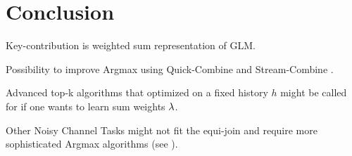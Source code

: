 \chapter{Conclusion}
\label{ch:conclusion}

\begin{draft}
Key-contribution is weighted sum representation of GLM.

Possibility to improve Argmax using Quick-Combine \parencite{Guentzer2000} and
Stream-Combine \parencite{Guentzer2001}.

Advanced top-k algorithms that optimized on a fixed history $h$ might be called
for if one wants to learn sum weights $\lambda$.

Other Noisy Channel Tasks might not fit the equi-join and require more
sophisticated Argmax algorithms (see \parencite{Ilyas2004}).
\end{draft}
